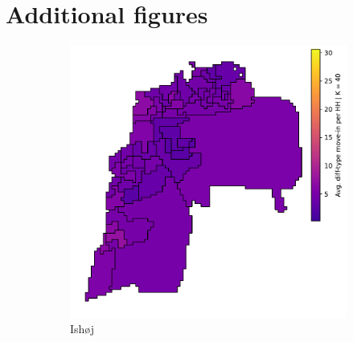 \documentclass[../main.tex]{subfiles}
\begin{document}

\section{Additional figures}
\begin{figure}
\centering
\caption{Incidence of new different-type neighbors at the neighborhood level} \label{fig:incidence_different_type_neighborhood}
	\begin{subfigure}{.5\textwidth}	
	\centering
	\includegraphics[width=\textwidth]{figs/ishoj_howdy_neighbor.pdf}	
	\caption{Ishøj}
	\end{subfigure}
    \begin{subfigure}{.42\textwidth}	
	\centering

\end{subfigure}
\end{figure}
\end{document}
